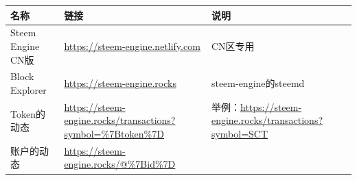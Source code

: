 \documentclass[]{ctexbook}
\begin{document}
\begin{longtable}[]{@{}lll@{}}
\toprule
\begin{minipage}[b]{0.30\columnwidth}\raggedright
名称\strut
\end{minipage} & \begin{minipage}[b]{0.30\columnwidth}\raggedright
链接\strut
\end{minipage} & \begin{minipage}[b]{0.30\columnwidth}\raggedright
说明\strut
\end{minipage}\tabularnewline
\midrule
\endhead
\begin{minipage}[t]{0.30\columnwidth}\raggedright
Steem Engine CN版\strut
\end{minipage} & \begin{minipage}[t]{0.30\columnwidth}\raggedright
\url{https://steem-engine.netlify.com}\strut
\end{minipage} & \begin{minipage}[t]{0.30\columnwidth}\raggedright
CN区专用\strut
\end{minipage}\tabularnewline
\begin{minipage}[t]{0.30\columnwidth}\raggedright
Block Explorer\strut
\end{minipage} & \begin{minipage}[t]{0.30\columnwidth}\raggedright
\url{https://steem-engine.rocks}\strut
\end{minipage} & \begin{minipage}[t]{0.30\columnwidth}\raggedright
steem-engine的steemd\strut
\end{minipage}\tabularnewline
\begin{minipage}[t]{0.30\columnwidth}\raggedright
Token的动态\strut
\end{minipage} & \begin{minipage}[t]{0.30\columnwidth}\raggedright
\url{https://steem-engine.rocks/transactions?symbol=\%7Btoken\%7D}\strut
\end{minipage} & \begin{minipage}[t]{0.30\columnwidth}\raggedright
举例：\url{https://steem-engine.rocks/transactions?symbol=SCT}\strut
\end{minipage}\tabularnewline
\begin{minipage}[t]{0.30\columnwidth}\raggedright
账户的动态\strut
\end{minipage} & \begin{minipage}[t]{0.30\columnwidth}\raggedright
\url{https://steem-engine.rocks/@\%7Bid\%7D}\strut
\end{minipage} & \begin{minipage}[t]{0.30\columnwidth}\raggedright

\end{minipage}
\end{longtable}
\end{document}
